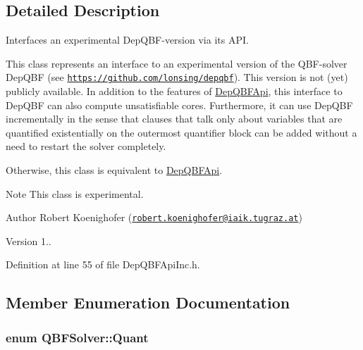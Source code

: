\subsection{Detailed Description}
Interfaces an experimental Dep\-Q\-B\-F-\/version via its A\-P\-I. 

This class represents an interface to an experimental version of the Q\-B\-F-\/solver Dep\-Q\-B\-F (see \href{https://github.com/lonsing/depqbf}{\tt https\-://github.\-com/lonsing/depqbf}). This version is not (yet) publicly available. In addition to the features of \hyperlink{classDepQBFApi}{Dep\-Q\-B\-F\-Api}, this interface to Dep\-Q\-B\-F can also compute unsatisfiable cores. Furthermore, it can use Dep\-Q\-B\-F incrementally in the sense that clauses that talk only about variables that are quantified existentially on the outermost quantifier block can be added without a need to restart the solver completely.

Otherwise, this class is equivalent to \hyperlink{classDepQBFApi}{Dep\-Q\-B\-F\-Api}.

\begin{DoxyNote}{Note}
This class is experimental. 
\end{DoxyNote}
\begin{DoxyAuthor}{Author}
Robert Koenighofer (\href{mailto:robert.koenighofer@iaik.tugraz.at}{\tt robert.\-koenighofer@iaik.\-tugraz.\-at}) 
\end{DoxyAuthor}
\begin{DoxyVersion}{Version}
1.. 
\end{DoxyVersion}


Definition at line 55 of file Dep\-Q\-B\-F\-Api\-Inc.\-h.



\subsection{Member Enumeration Documentation}
\hypertarget{classQBFSolver_ac091e263cb55286cc07b2451bcf4d3c7}{
\subsubsection[{Quant}]{\setlength{\rightskip}{0pt plus 5cm}enum {\bf Q\-B\-F\-Solver\-::\-Quant}\hspace{0.3cm}{\ttfamily [inherited]}}}\label{classQBFSolver_ac091e263cb55286cc07b2451bcf4d3c7}


